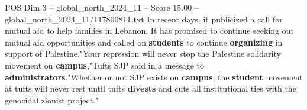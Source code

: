 \begin{textsample}{POS Dim 3 – global\_north\_2024\_11 – Score 15.00 – global\_north\_2024\_11/117800811.txt}
In recent days, it publicized a call for mutual aid to help families in Lebanon.
It has promised to continue seeking out mutual aid opportunities and called on \textbf{students} to continue \textbf{organizing} in support of Palestine."Your repression will never stop the Palestine solidarity movement on \textbf{campus},"Tufts SJP said in a message to \textbf{administrators}."Whether or not SJP exists on \textbf{campus}, the \textbf{student} movement at tufts will never rest until tufts \textbf{divests} and cuts all institutional ties with the genocidal zionist project."

\end{textsample}
